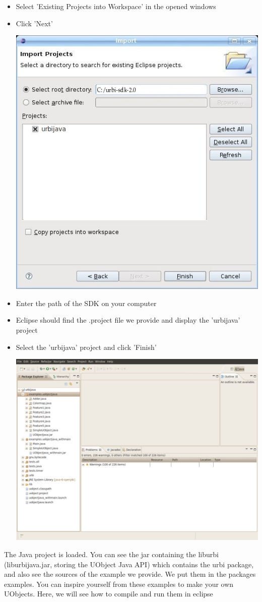 \begin{itemize}
\item Select 'Existing Projects into Workspace' in the opened windows
\item Click 'Next'

  \begin{center}
    \includegraphics[width=0.6\linewidth]{img/select-proj}
  \end{center}

\item Enter the path of the \urbi SDK on your computer
\item Eclipse should find the .project file we provide and display the
  'urbijava' project
\item Select the 'urbijava' project and click 'Finish'

  \begin{center}
    \includegraphics[width=0.6\linewidth]{img/project-uobject-open}
  \end{center}

\end{itemize}

The Java project is loaded. You can see the jar containing the liburbi
(liburbijava.jar, storing the UObject Java API) which contains the urbi package, and
also see the sources of the example we provide. We put them in the packages
examples.  You can inspire yourself from these examples to make
your own UObjects.  Here, we will see how to compile and run them in eclipse


